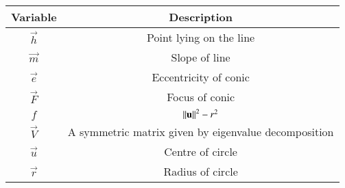 \begin{tabular}[12pt]{ |c| c|}
    \hline
    \textbf{Variable} & \textbf{Description}\\ 
    \hline
	$\vec{h}$ & Point lying on the line\\
	\hline
	$\vec{m}$ & Slope of line\\
	\hline
	$\vec{e}$ & Eccentricity of conic\\
	\hline
	$\vec{F}$ & Focus of conic\\
	\hline
	$f$ & $\left\lVert\mathbf{u}\right\rVert^2-r^2$\\
	\hline
	$\vec{V}$ & A symmetric matrix given by eigenvalue decomposition\\
	\hline
	$\vec{u}$ & Centre of circle\\
	\hline
	$\vec{r}$ & Radius of circle\\
	\hline
\end{tabular}
